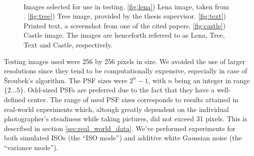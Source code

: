 \documentclass[12pt,notitlepage]{report}
\begin{document}
\begin{figure}[htb]
  \centering
	  ~
	  ~
	  ~
  \caption[Images selected for use in testing]{Images selected for use in testing. \ref{fig:lena}) Lena image, taken from  \cite{uscimgdb}. \ref{fig:tree}) Tree image, provided by the thesis supervisor. \ref{fig:text}) Printed text, a screenshot from one of the cited papers. \ref{fig:castle}) Castle image. The images are henceforth referred to as Lena, Tree, Text and Castle, respectively.}
  \label{fig:used_images}
\end{figure}



Testing images used were 256 by 256 pixels in size. We avoided the use of larger resolutions since they tend to be computationally expensive, especially in case of Šroubek's algorithm. The PSF sizes were $2^n - 1$, with $n$ being an integer in range $\lbrace 2 \dots 5 \rbrace$. Odd-sized PSFs are preferred due to the fact that they have a well-defined center. The range of used PSF sizes corresponds to results attained in real-world experiments which, altough greatly dependent on the individual photographer's steadiness while taking pictures,  did not exceed 31 pixels. This is described in section \ref{sec:real_world_data}. We've performed experiments for both simulated ISOs (the ``ISO mode'') and additive white Gaussian noise  (the ``variance mode'').
\end{document}
